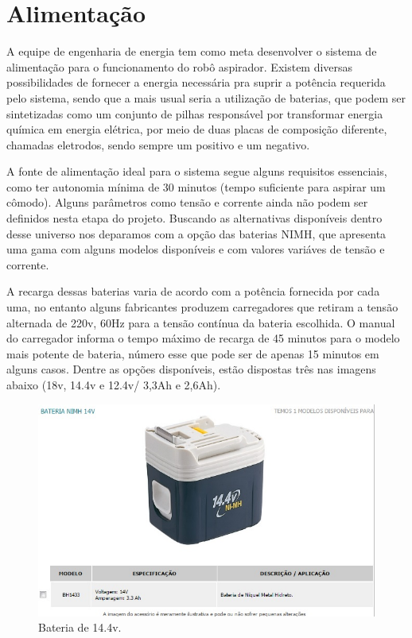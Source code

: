 \section{Alimentação} %
\label{sub:alimentação}
	A equipe de engenharia de energia tem como meta desenvolver o sistema de alimentação para o funcionamento do robô aspirador. Existem diversas possibilidades de fornecer a energia necessária pra suprir a potência requerida pelo sistema, sendo que a mais usual seria a utilização de baterias, que podem ser sintetizadas como um conjunto de pilhas responsável por transformar energia química em energia elétrica, por meio de duas placas de composição diferente, chamadas eletrodos, sendo sempre um positivo e um negativo. 

	A fonte de alimentação ideal para o sistema segue alguns requisitos essenciais, como ter autonomia mínima de 30 minutos (tempo suficiente para aspirar um cômodo). Alguns parâmetros como tensão e corrente ainda não podem ser definidos nesta etapa do projeto. Buscando as alternativas disponíveis dentro desse universo nos deparamos com a opção das baterias NIMH, que apresenta uma gama com alguns modelos disponíveis e com valores variáves de tensão e corrente.
	
	A recarga dessas baterias varia de acordo com a potência fornecida por cada uma, no entanto alguns fabricantes produzem carregadores que retiram a tensão alternada de 220v, 60Hz para a tensão contínua da bateria escolhida. O manual do carregador informa o tempo máximo de recarga de 45 minutos para o modelo mais potente de bateria, número esse que pode ser de apenas 15 minutos em alguns casos. Dentre as opções disponíveis, estão dispostas três nas imagens abaixo (18v, 14.4v e 12.4v/ 3,3Ah e 2,6Ah).

	\begin{figure}[H]
		\centering
		\includegraphics[scale=0.55]{figuras/bateria_1.png}
		\caption{Bateria de 14.4v.}
		\label{img:bateria_1}
	\end{figure}

